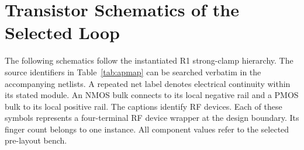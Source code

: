 \section{Transistor Schematics of the Selected Loop}
\label{sec:schematicatlas}
The following schematics follow the instantiated R1 strong-clamp hierarchy.
The source identifiers in Table~\ref{tab:apmap} can be searched verbatim in
the accompanying netlists. A repeated net label denotes electrical
continuity within its stated module. An NMOS bulk connects to its local
negative rail and a PMOS bulk to its local positive rail. The captions identify RF devices. Each of these symbols represents a four-terminal RF device wrapper at the design boundary.
Its finger count belongs to one instance. All component values refer to the
selected pre-layout bench.

\begin{table}[!t]
\centering\caption{Schematic-to-netlist map for the selected loop.}
\label{tab:apmap}
\small
{}
\end{table}


\newcommand{\APgleft}[2]{\draw (#1.G) -- ++(-.24,0) node[left]{#2};}
\newcommand{\APgright}[2]{\draw (#1.G) -- ++(.24,0) node[right]{#2};}
\newcommand{\APtop}[2]{\draw (#1) -- ++(0,.27) node[above]{#2};}
\newcommand{\APbot}[2]{\draw (#1) -- ++(0,-.27) node[below]{#2};}


